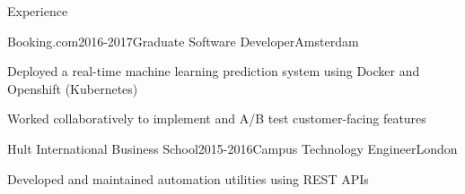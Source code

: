 \documentclass{resume} %
\begin{document}
\begin{rSection}{Experience}
\begin{rSubsection}{{Booking.com}}{2016-2017}{Graduate Software Developer}{Amsterdam}
    \item Deployed a real-time machine learning prediction system using Docker and Openshift (Kubernetes)
    \item Worked collaboratively to implement and A/B test customer-facing features
\end{rSubsection}

\begin{rSubsection}{{Hult International Business School}}{2015-2016}{Campus Technology Engineer}{London}
    \item Developed and maintained automation utilities using REST APIs
\end{rSubsection}

\end{rSection}

\end{document}
